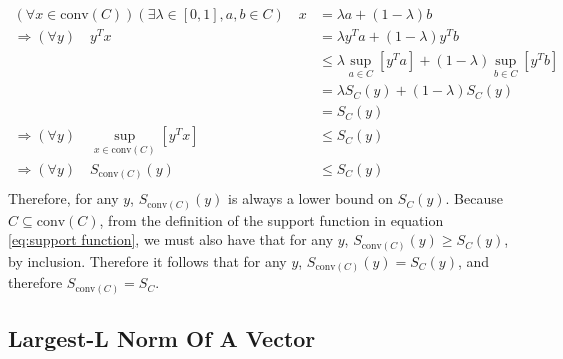 \begin{align*}
    (\forall x\in\text{conv}(C))(\exists \lambda\in[0, 1], a, b\in C) \quad x &= \lambda a + (1 - \lambda) b \\
    \Rightarrow(\forall y) \quad y^T x &= \lambda y^T a + (1 - \lambda) y^T b \\
    & \le \lambda \underset{a\in C}{\sup}\left[ y^T a \right] + (1 - \lambda) \underset{b\in C}{\sup}\left[ y^T b \right] \\
    &= \lambda S_C(y) + (1 - \lambda) S_C(y) \\
    &= S_C(y) \\
    \Rightarrow(\forall y) \quad \underset{x\in\text{conv}(C)}{\sup}\left[ y^T x \right] &\le S_C(y) \\
    \Rightarrow(\forall y) \quad S_{\text{conv}(C)}(y) &\le S_C(y) \\
\end{align*}
Therefore, for any $y$, $S_{\text{conv}(C)}(y)$ is always a lower bound on $S_C(y)$. Because $C \subseteq \text{conv}(C)$, from the definition of the support function in equation \ref{eq:support function}, we must also have that for any $y$, $S_{\text{conv}(C)}(y) \ge S_C(y)$, by inclusion. Therefore it follows that for any $y$, $S_{\text{conv}(C)}(y) = S_C(y)$, and therefore $S_{\text{conv}(C)} = S_C$.

\subsection{Largest-L Norm Of A Vector}
